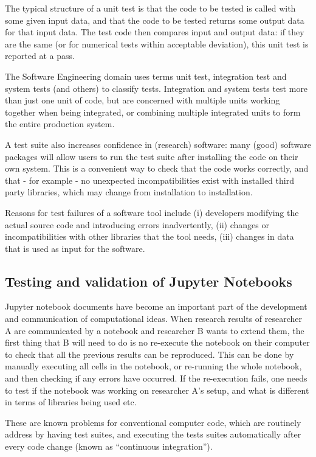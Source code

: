 \documentclass{deliverablereport}
\begin{document}
The typical structure of a unit test is that the code to be tested is
called with some given input data, and that the code to be tested
returns some output data for that input data. The test code then
compares input and output data: if they are the same (or for numerical
tests within acceptable deviation), this unit test is reported at a pass.

The Software Engineering domain uses terms unit test, integration test
and system tests (and others) to classify tests. Integration and
system tests test more than just one unit of code, but are concerned
with multiple units working together when being integrated, or
combining multiple integrated units to form the entire production
system.

A test suite also increases confidence in (research) software: many
(good) software packages will allow users to run the test suite after
installing the code on their own system. This is a convenient way to
check that the code works correctly, and that - for example - no
unexpected incompatibilities exist with installed third party
libraries, which may change from installation to installation.

Reasons for test failures of a software tool include (i) developers
modifying the actual source code and introducing errors inadvertently,
(ii) changes or incompatibilities with other libraries that the tool
needs, (iii) changes in data that is used as input for the
software.

\subsection{Testing and validation of Jupyter Notebooks}

Jupyter notebook documents have become an important part of the
development and communication of computational ideas. When research
results of researcher A are communicated by a notebook and researcher
B wants to extend them, the first thing that B will need to do is no
re-execute the notebook on their computer to check that all the
previous results can be reproduced. This can be done by manually
executing all cells in the notebook, or re-running the whole notebook,
and then checking if any errors have occurred. If the re-execution
fails, one needs to test if the notebook was working on researcher A's
setup, and what is different in terms of libraries being used etc.

These are known problems for conventional computer code, which are
routinely address by having test suites, and executing the tests
suites automatically after every code change (known as ``continuous
integration'').
\end{document}
